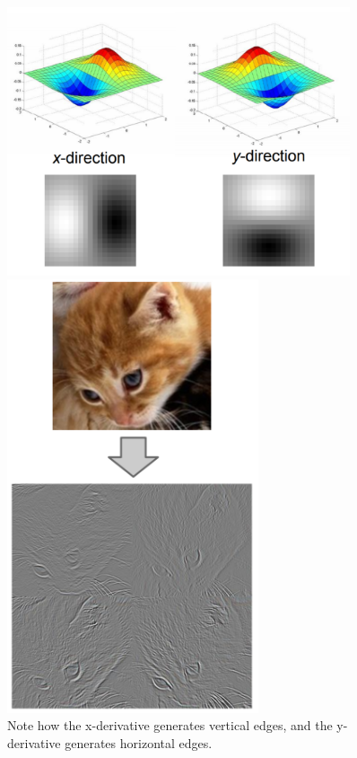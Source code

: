 \documentclass{article}
\begin{document}
\begin{figure}[htbp]
    \centering
    \begin{minipage}{0.45\textwidth}
        \centering
        \includegraphics[width=0.9\textwidth]{gaussianedge.PNG} %
        \caption{Note how the x-derivative generates vertical edges, and the y-derivative generates horizontal edges.}
    \end{minipage}\hfill
    \begin{minipage}{0.45\textwidth}
        \centering
        \includegraphics[width=0.66\textwidth]{derivatives.PNG} %
    \end{minipage}
\end{figure}
\end{document}
